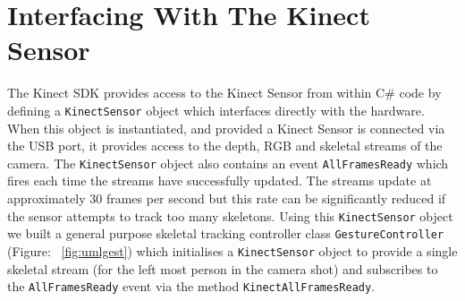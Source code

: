 \chapter{Interfacing With The Kinect Sensor}
\ifpdf
    \graphicspath{{Chapter3/Chapter3Figs/PNG/}{Chapter3/Chapter3Figs/PDF/}{Chapter3/Chapter3Figs/}}
\else
    \graphicspath{{Chapter3/Chapter3Figs/EPS/}{Chapter3/Chapter3Figs/}}
\fi


The Kinect SDK provides access to the Kinect Sensor from within C\# code by defining a \verb|KinectSensor| object which interfaces directly with the hardware. When this object is instantiated, and provided a Kinect Sensor is connected via the USB port, it provides access to the depth, RGB and skeletal streams of the camera. The \verb|KinectSensor| object also contains an event  \verb|AllFramesReady| which fires each time the streams have successfully updated. The streams update at approximately 30 frames per second but this rate can be significantly reduced if the sensor attempts to track too many skeletons. Using this \verb|KinectSensor| object we built a general purpose skeletal tracking controller class \verb|GestureController| (Figure: ~\ref{fig:umlgest}) which initialises a \verb|KinectSensor| object to provide a single skeletal stream (for the left most person in the camera shot) and subscribes to the \verb|AllFramesReady| event via the method \verb|KinectAllFramesReady|.

